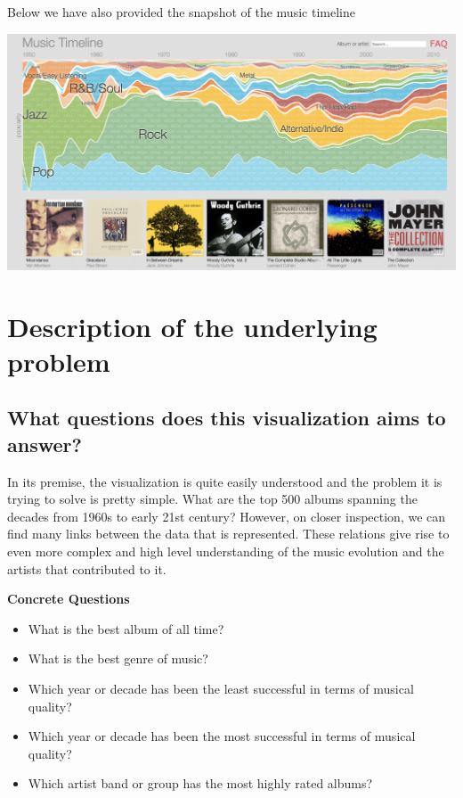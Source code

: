 \documentclass{article}
\begin{document}
Below we have also provided the snapshot of the music timeline

\includegraphics[width=\textwidth]{VisualAnalytics/Assignment1/images/music-timeline.png}

\section{Description of the underlying problem}

\subsection{What questions does this visualization aims to answer?}

In its premise, the visualization is quite easily understood and the problem it is trying to solve is pretty simple. What are the top 500 albums spanning the decades from 1960s to early 21st century? However, on closer inspection, we can find many links between the data that is represented. These relations give rise to even more complex and high level understanding of the music evolution and the artists that contributed to it. 

\textbf{Concrete Questions}
\begin{itemize} 
    \item What is the best album of all time?
    \item What is the best genre of music?
    \item Which year or decade has been the least successful in terms of musical quality? 
    \item Which year or decade has been the most successful in terms of musical quality? 
    \item Which artist band or group has the most highly rated albums?
\end{itemize}
\end{document}
